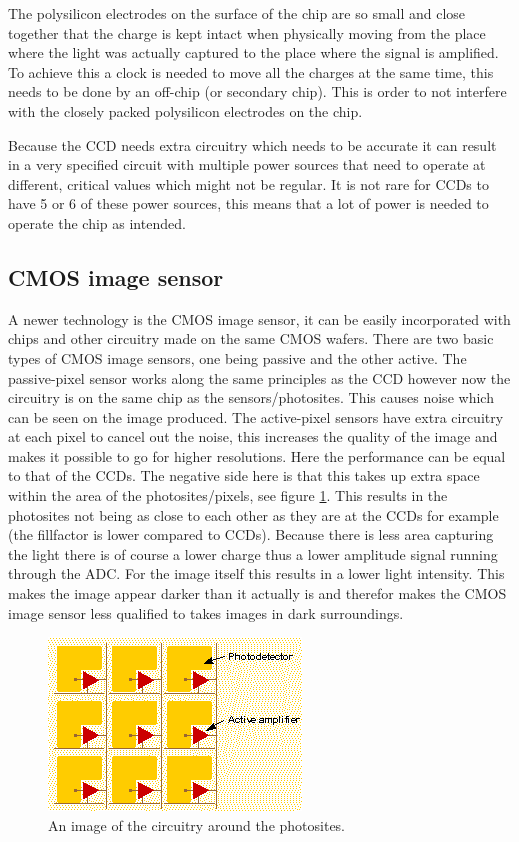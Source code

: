 \documentclass{article}
\begin{document}
The polysilicon electrodes on the surface of the chip are so small and close together that the charge is kept intact when physically moving from the place where the light was actually captured to the place where the signal is amplified. To achieve this a clock is needed to move all the charges at the same time, this needs to be done by an off-chip (or secondary chip). This is order to not interfere with the closely packed polysilicon electrodes on the chip. 

Because the CCD needs extra circuitry which needs to be accurate it can result in a very specified circuit with multiple power sources that need to operate at different, critical values which might not be regular. It is not rare for CCDs to have 5 or 6 of these power sources, this means that a lot of power is needed to operate the chip as intended.


\subsection{CMOS image sensor}

A newer technology is the CMOS image sensor, it can be easily incorporated with chips and other circuitry made on the same CMOS wafers. There are two basic types of CMOS image sensors, one being passive and the other active. The passive-pixel sensor works along the same principles as the CCD however now the circuitry is on the same chip as the sensors/photosites. This causes noise which can be seen on the image produced. The active-pixel sensors have extra circuitry at each pixel to cancel out the noise, this increases the quality of the image and makes it possible to go for higher resolutions. Here the performance can be equal to that of the CCDs. The negative side here is that this takes up extra space within the area of the photosites/pixels, see figure \ref{cmos1}. This results in the photosites not being as close to each other as they are at the CCDs for example (the fillfactor is lower compared to CCDs). Because there is less area capturing the light there is of course a lower charge thus a lower amplitude signal running through the ADC. For the image itself this results in a lower light intensity. This makes the image appear darker than it actually is and therefor makes the CMOS image sensor  less qualified to takes images in dark surroundings.

\begin{figure}[H]
	\centering
	\includegraphics[scale=1]{figures/fillfactor}
	\caption{An image of the circuitry around the photosites. }
	\label{cmos1}
\end{figure}
\end{document}
